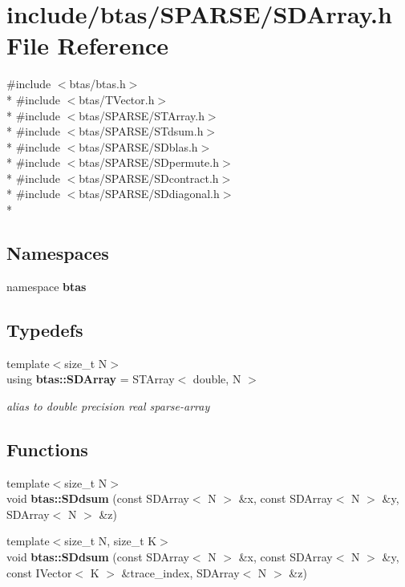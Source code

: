\section{include/btas/\-S\-P\-A\-R\-S\-E/\-S\-D\-Array.h File Reference}
\label{da/da3/SDArray_8h}
{\ttfamily \#include $<$btas/btas.\-h$>$}\\*
{\ttfamily \#include $<$btas/\-T\-Vector.\-h$>$}\\*
{\ttfamily \#include $<$btas/\-S\-P\-A\-R\-S\-E/\-S\-T\-Array.\-h$>$}\\*
{\ttfamily \#include $<$btas/\-S\-P\-A\-R\-S\-E/\-S\-Tdsum.\-h$>$}\\*
{\ttfamily \#include $<$btas/\-S\-P\-A\-R\-S\-E/\-S\-Dblas.\-h$>$}\\*
{\ttfamily \#include $<$btas/\-S\-P\-A\-R\-S\-E/\-S\-Dpermute.\-h$>$}\\*
{\ttfamily \#include $<$btas/\-S\-P\-A\-R\-S\-E/\-S\-Dcontract.\-h$>$}\\*
{\ttfamily \#include $<$btas/\-S\-P\-A\-R\-S\-E/\-S\-Ddiagonal.\-h$>$}\\*
\subsection*{Namespaces}
\begin{DoxyCompactItemize}
\item 
namespace {\bf btas}
\end{DoxyCompactItemize}
\subsection*{Typedefs}
\begin{DoxyCompactItemize}
\item 
{\footnotesize template$<$size\-\_\-t N$>$ }\\using {\bf btas\-::\-S\-D\-Array} = S\-T\-Array$<$ double, N $>$
\begin{DoxyCompactList}\small\item\em alias to double precision real sparse-\/array \end{DoxyCompactList}\end{DoxyCompactItemize}
\subsection*{Functions}
\begin{DoxyCompactItemize}
\item 
{\footnotesize template$<$size\-\_\-t N$>$ }\\void {\bf btas\-::\-S\-Ddsum} (const S\-D\-Array$<$ N $>$ \&x, const S\-D\-Array$<$ N $>$ \&y, S\-D\-Array$<$ N $>$ \&z)
\item 
{\footnotesize template$<$size\-\_\-t N, size\-\_\-t K$>$ }\\void {\bf btas\-::\-S\-Ddsum} (const S\-D\-Array$<$ N $>$ \&x, const S\-D\-Array$<$ N $>$ \&y, const I\-Vector$<$ K $>$ \&trace\-\_\-index, S\-D\-Array$<$ N $>$ \&z)
\end{DoxyCompactItemize}
